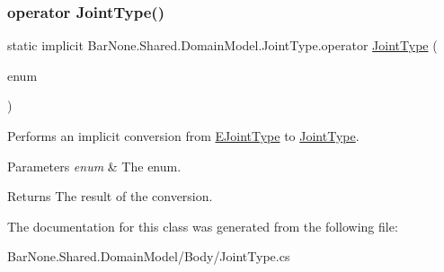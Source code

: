 \subsubsection{\texorpdfstring{operator Joint\+Type()}{operator JointType()}}
{\footnotesize\ttfamily static implicit Bar\+None.\+Shared.\+Domain\+Model.\+Joint\+Type.\+operator \mbox{\hyperlink{class_bar_none_1_1_shared_1_1_domain_model_1_1_joint_type}{Joint\+Type}} (\begin{DoxyParamCaption}\item[{\mbox{\hyperlink{namespace_bar_none_1_1_shared_1_1_domain_model_a1aeba40858ef83a78921f013cdabb369}{E\+Joint\+Type}} @}]{enum }\end{DoxyParamCaption})\hspace{0.3cm}{\ttfamily [static]}}



Performs an implicit conversion from \mbox{\hyperlink{namespace_bar_none_1_1_shared_1_1_domain_model_a1aeba40858ef83a78921f013cdabb369}{E\+Joint\+Type}} to \mbox{\hyperlink{class_bar_none_1_1_shared_1_1_domain_model_1_1_joint_type}{Joint\+Type}}. 


\begin{DoxyParams}{Parameters}
{\em enum} & The enum.\\
\hline
\end{DoxyParams}
\begin{DoxyReturn}{Returns}
The result of the conversion. 
\end{DoxyReturn}


The documentation for this class was generated from the following file\+:\begin{DoxyCompactItemize}
\item 
Bar\+None.\+Shared.\+Domain\+Model/\+Body/Joint\+Type.\+cs\end{DoxyCompactItemize}
